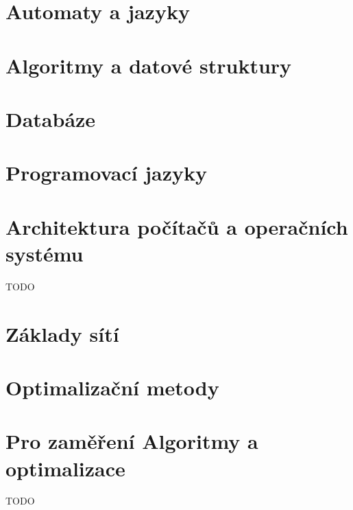 


\section{Automaty a jazyky}


\section{Algoritmy a datové struktury}


\section{Databáze}


\section{Programovací jazyky}


\section{Architektura počítačů a operačních systému}
TODO

\section{Základy sítí}


\section{Optimalizační metody}


\section{Pro zaměření Algoritmy a optimalizace}
TODO

